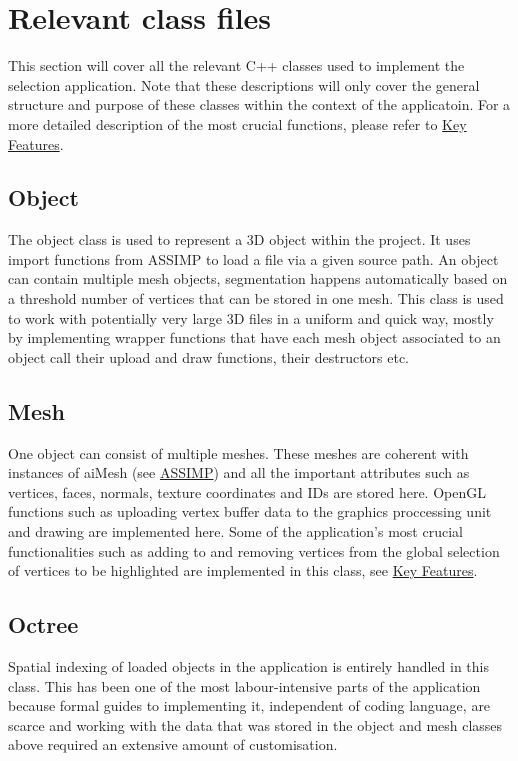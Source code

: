 \section{Relevant class files}
\label{sec:relevant_class_files}

This section will cover all the relevant C++ classes used to implement the selection application. Note that these descriptions will only cover the general structure and purpose of these classes within the context of the applicatoin. For a more detailed description of the most crucial functions, please refer to \hyperref[sec:key_features]{Key Features}.

\subsection{Object}
\label{sec:object}

The object class is used to represent a 3D object within the project. It uses import functions from ASSIMP to load a file via a given source path. An object can contain multiple mesh objects, segmentation happens automatically based on a threshold number of vertices that can be stored in one mesh. This class is used to work with potentially very large 3D files in a uniform and quick way, mostly by implementing wrapper functions that have each mesh object associated to an object call their upload and draw functions, their destructors etc.

\subsection{Mesh}
\label{sec:mesh}

One object can consist of multiple meshes. These meshes are coherent with instances of aiMesh (see \hyperref[sec:assimp]{ASSIMP}) and all the important attributes such as vertices, faces, normals, texture coordinates and IDs are stored here. OpenGL functions such as uploading vertex buffer data to the graphics proccessing unit and drawing are implemented here. Some of the application's most crucial functionalities such as adding to and removing vertices from the global selection of vertices to be highlighted are implemented in this class, see \hyperref[sec:key_features]{Key Features}.

\subsection{Octree}
\label{sec:octree}
Spatial indexing of loaded objects in the application is entirely handled in this class. This has been one of the most labour-intensive parts of the application because formal guides to implementing it, independent of coding language, are scarce and working with the data that was stored in the object and mesh classes above required an extensive amount of customisation.

